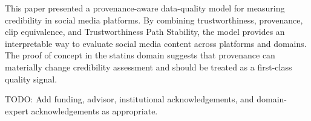 \documentclass[sigconf, nonacm]{acmart}
\begin{document}
This paper presented a provenance-aware data-quality model for measuring
credibility in social media platforms. By combining trustworthiness, provenance,
clip equivalence, and Trustworthiness Path Stability, the model provides an
interpretable way to evaluate social media content across platforms and domains.
The proof of concept in the statins domain suggests that provenance can materially
change credibility assessment and should be treated as a first-class quality signal.

\begin{acks}
TODO: Add funding, advisor, institutional acknowledgements, and domain-expert
acknowledgements as appropriate.
\end{acks}



\end{document}

